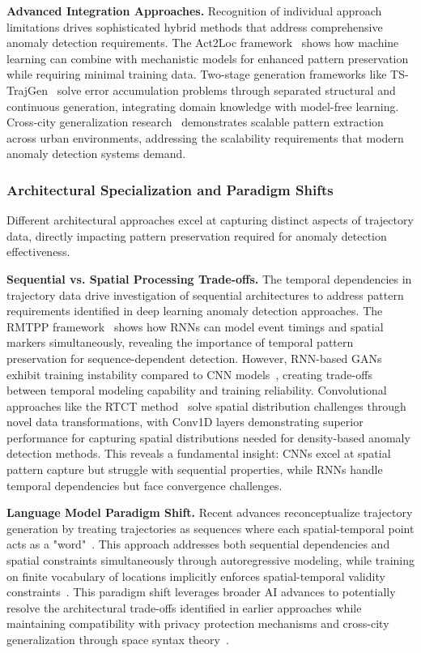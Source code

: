\documentclass[runningheads]{llncs}
\begin{document}
\textbf{Advanced Integration Approaches.} Recognition of individual approach limitations drives sophisticated hybrid methods that address comprehensive anomaly detection requirements. The Act2Loc framework~\cite{liu2023act2loc} shows how machine learning can combine with mechanistic models for enhanced pattern preservation while requiring minimal training data. Two-stage generation frameworks like TS-TrajGen~\cite{jiang2023continuous} solve error accumulation problems through separated structural and continuous generation, integrating domain knowledge with model-free learning. Cross-city generalization research~\cite{wang2025gtg} demonstrates scalable pattern extraction across urban environments, addressing the scalability requirements that modern anomaly detection systems demand.

\subsubsection{Architectural Specialization and Paradigm Shifts}

Different architectural approaches excel at capturing distinct aspects of trajectory data, directly impacting pattern preservation required for anomaly detection effectiveness.

\textbf{Sequential vs. Spatial Processing Trade-offs.} The temporal dependencies in trajectory data drive investigation of sequential architectures to address pattern requirements identified in deep learning anomaly detection approaches. The RMTPP framework~\cite{du2016recurrent} shows how RNNs can model event timings and spatial markers simultaneously, revealing the importance of temporal pattern preservation for sequence-dependent detection. However, RNN-based GANs exhibit training instability compared to CNN models~\cite{merhi2024synthetic}, creating trade-offs between temporal modeling capability and training reliability. Convolutional approaches like the RTCT method~\cite{merhi2024synthetic} solve spatial distribution challenges through novel data transformations, with Conv1D layers demonstrating superior performance for capturing spatial distributions needed for density-based anomaly detection methods. This reveals a fundamental insight: CNNs excel at spatial pattern capture but struggle with sequential properties, while RNNs handle temporal dependencies but face convergence challenges.

\textbf{Language Model Paradigm Shift.} Recent advances reconceptualize trajectory generation by treating trajectories as sequences where each spatial-temporal point acts as a "word"~\cite{zhang2025end}. This approach addresses both sequential dependencies and spatial constraints simultaneously through autoregressive modeling, while training on finite vocabulary of locations implicitly enforces spatial-temporal validity constraints~\cite{kong2023mobility}. This paradigm shift leverages broader AI advances to potentially resolve the architectural trade-offs identified in earlier approaches while maintaining compatibility with privacy protection mechanisms and cross-city generalization through space syntax theory~\cite{wang2025gtg}.
\end{document}
